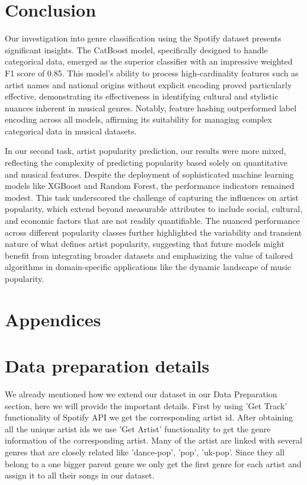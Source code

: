 \documentclass{article}
\begin{document}
\section{Conclusion}

Our investigation into genre classification using the Spotify dataset presents significant insights. The CatBoost model, specifically designed to handle categorical data, emerged as the superior classifier with an impressive weighted F1 score of 0.85. This model's ability to process high-cardinality features such as artist names and national origins without explicit encoding proved particularly effective, demonstrating its effectiveness in identifying cultural and stylistic nuances inherent in musical genres. Notably, feature hashing outperformed label encoding across all models, affirming its suitability for managing complex categorical data in musical datasets.

In our second task, artist popularity prediction, our results were more mixed, reflecting the complexity of predicting popularity based solely on quantitative and musical features. Despite the deployment of sophisticated machine learning models like XGBoost and Random Forest, the performance indicators remained modest. This task underscored the challenge of capturing the influences on artist popularity, which extend beyond measurable attributes to include social, cultural, and economic factors that are not readily quantifiable. The nuanced performance across different popularity classes further highlighted the variability and transient nature of what defines artist popularity, suggesting that future models might benefit from integrating broader datasets and emphasizing the value of tailored algorithms in domain-specific applications like the dynamic landscape of music popularity.




\section{Appendices}

\appendix

\section{Data preparation details}

We already mentioned how we extend our dataset in our Data Preparation section, here we will provide the important details. First by using 'Get Track' functionality of Spotify API we get the corresponding artist id. After obtaining all the unique artist ids we use 'Get Artist' functionality to get the genre information of the corresponding artist. Many of the artist are linked with several genres that are closely related like 'dance-pop', 'pop', 'uk-pop'. Since they all belong to a one bigger parent genre we only get the first genre for each artist and assign it to all their songs in our dataset.
\end{document}
